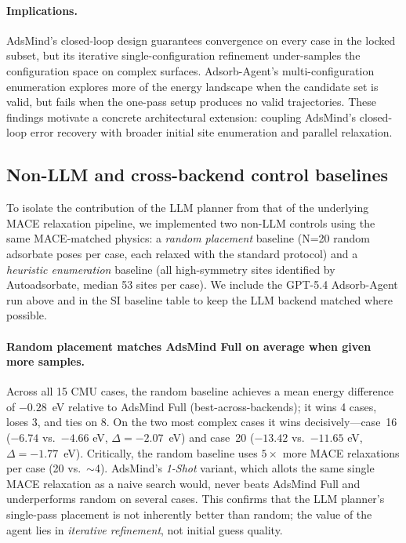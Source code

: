 \paragraph{Implications.}
AdsMind's closed-loop design guarantees convergence on every case in the locked subset, but its iterative single-configuration refinement under-samples the configuration space on complex surfaces.
Adsorb-Agent's multi-configuration enumeration explores more of the energy landscape when the candidate set is valid, but fails when the one-pass setup produces no valid trajectories.
These findings motivate a concrete architectural extension: coupling AdsMind's closed-loop error recovery with broader initial site enumeration and parallel relaxation.

\subsection{Non-LLM and cross-backend control baselines}

To isolate the contribution of the LLM planner from that of the underlying MACE relaxation pipeline, we implemented two non-LLM controls using the same MACE-matched physics: a \textit{random placement} baseline (N=20 random adsorbate poses per case, each relaxed with the standard protocol) and a \textit{heuristic enumeration} baseline (all high-symmetry sites identified by Autoadsorbate, median 53 sites per case).
We include the GPT-5.4 Adsorb-Agent run above and in the SI baseline table to keep the LLM backend matched where possible.

\paragraph{Random placement matches AdsMind Full on average when given more samples.}
Across all 15 CMU cases, the random baseline achieves a mean energy difference of $-0.28$~eV relative to AdsMind Full (best-across-backends); it wins 4 cases, loses 3, and ties on 8.
On the two most complex cases it wins decisively---case~16 ($-6.74$ vs.\ $-4.66$ eV, $\Delta = -2.07$~eV) and case~20 ($-13.42$ vs.\ $-11.65$ eV, $\Delta = -1.77$~eV).
Critically, the random baseline uses $5\times$ more MACE relaxations per case (20 vs.\ $\sim$4).
AdsMind's \textit{1-Shot} variant, which allots the same single MACE relaxation as a naive search would, never beats AdsMind Full and underperforms random on several cases.
This confirms that the LLM planner's single-pass placement is not inherently better than random; the value of the agent lies in \textit{iterative refinement}, not initial guess quality.

